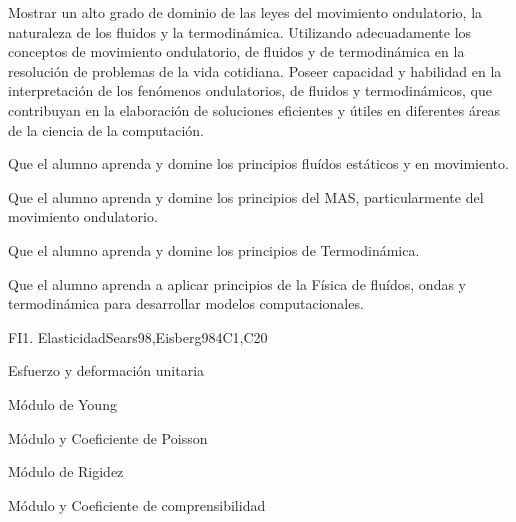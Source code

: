 \begin{syllabus}


\begin{justification}
Mostrar un alto grado de dominio de las leyes del movimiento ondulatorio, la naturaleza de los fluidos y la termodinámica. Utilizando adecuadamente los conceptos de movimiento ondulatorio, de fluidos y de termodinámica en la resolución de problemas de la vida cotidiana. Poseer capacidad y habilidad en la interpretación de los fenómenos ondulatorios, de fluidos y termodinámicos, que contribuyan en la elaboración de soluciones eficientes y útiles en diferentes áreas de la ciencia de la computación.
\end{justification}

\begin{goals}
\item  Que el alumno aprenda y domine los principios fluídos estáticos y en movimiento.
\item  Que el alumno aprenda y domine los principios del MAS, particularmente del movimiento ondulatorio.
\item  Que el alumno aprenda y domine los principios de Termodinámica.
\item  Que el alumno aprenda a aplicar principios de la Física de fluídos, ondas y termodinámica para desarrollar modelos computacionales.
\end{goals}

\begin{outcomes}
  \item {}
  \item {}
  \item {}
\end{outcomes}

\begin{competences}
    \item {}
    \item {}
\end{competences}

\begin{unit}{FI1. Elasticidad}{}{Sears98,Eisberg98}{4}{C1,C20}
\begin{topics}
         \item  Esfuerzo y deformación unitaria
	 \item  Módulo de Young
         \item  Módulo y Coeficiente de Poisson
	 \item  Módulo de Rigidez
         \item  Módulo y Coeficiente de comprensibilidad
   \end{topics}


\end{unit}
\end{syllabus}
